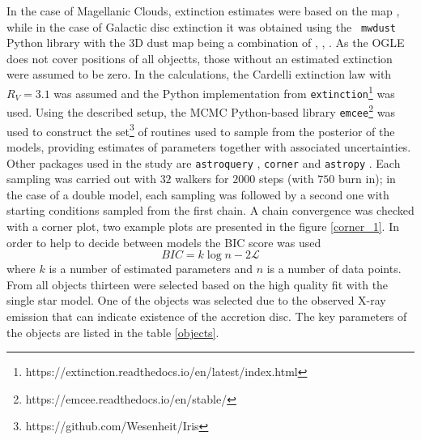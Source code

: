 \documentclass{pracalicmgr}
\begin{document}
In the case of Magellanic Clouds, extinction estimates were based on the map \citep{skowron_ogle-ing_2021}, while in the case of Galactic disc extinction it
was obtained using the \texttt{ mwdust} \citep{bovy_galactic_2016} Python library with the 3D dust map being a combination of \citep{green_3d_2019}, \citep{greiner_unusually_2001},
\citep{drimmel_three-dimensional_2003}.
As the OGLE does not cover positions of all objectts, those without an estimated extinction were assumed to be zero.
In the calculations, the Cardelli extinction law \citep{cardelli_relationship_1989} with $R_V=3.1$ was assumed
and the Python implementation from \texttt{extinction}\footnote{https://extinction.readthedocs.io/en/latest/index.html} was used.
Using the described setup, the MCMC Python-based library \texttt{emcee}\footnote{https://emcee.readthedocs.io/en/stable/} \citep{foreman-mackey_emcee_2013}
was used to construct the set\footnote{https://github.com/Wesenheit/Iris} of routines used to sample from the posterior of the models, providing estimates of parameters together
with associated uncertainties.
Other packages used in the study are \texttt{astroquery} \citep{ginsburg_astroquery_2019},
\texttt{corner} \citep{foreman-mackey_cornerpy_2016} and \texttt{astropy} \citep{astropy_collaboration_astropy_2022}.
Each sampling was carried out with $32$ walkers for $2000$ steps (with $750$ burn in); in the case of a double model, each sampling 
was followed by a second one with starting conditions sampled from the first chain. 
A chain convergence was checked with a corner plot, two example plots are presented in the figure
\ref{corner_1}.
In order to help to decide between models
the BIC score was used 
\begin{equation}
    BIC=k\log{n}-2\mathcal{L}
\end{equation} where $k$ is a number of estimated parameters and $n$ is a number of data points. From all objects thirteen were selected based on the high quality fit with the single star model.
One of the objects was selected due to the observed X-ray emission 
that can indicate existence of the accretion disc. The key parameters of the objects are listed in the table \ref{objects}.
\end{document}
